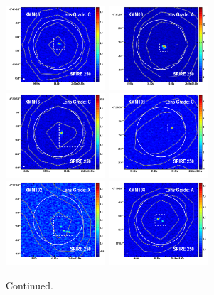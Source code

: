 \documentclass[iop]{emulateapj}
\begin{document}
\begin{figure}[!tbp]
\begin{centering}
\includegraphics[width=0.331\textwidth]{../Figures/overlays/XMM05_870_250.pdf}
\includegraphics[width=0.331\textwidth]{../Figures/overlays/XMM06_870_250.pdf}
\includegraphics[width=0.331\textwidth]{../Figures/overlays/XMM16_870_250.pdf}
\includegraphics[width=0.331\textwidth]{../Figures/overlays/XMM101_870_250.pdf}
\includegraphics[width=0.331\textwidth]{../Figures/overlays/XMM102_870_250.pdf}
\includegraphics[width=0.331\textwidth]{../Figures/overlays/XMM108_870_250.pdf}
\end{centering}

\caption{ Continued.}
\addtocounter{figure}{-1}

\end{figure}
\end{document}
